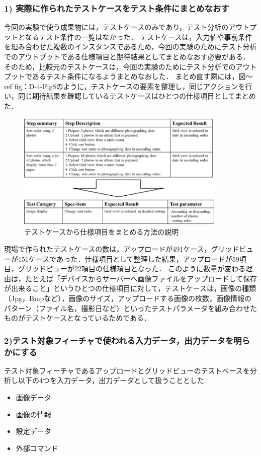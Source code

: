\subsubsection{1) 実際に作られたテストケースをテスト条件にまとめなおす}

今回の実験で使う成果物には，テストケースのみであり，テスト分析のアウトプットとなるテスト条件の一覧はなかった．
テストケースは，入力値や事前条件を組み合わせた複数のインスタンスであるため，今回の実験のためにテスト分析でのアウトプットである仕様項目と期待結果としてまとめなおす必要がある．
そのため，比較元のテストケースは，今回の実験のためにテスト分析でのアウトプットであるテスト条件になるようまとめなおした．
まとめ直す際には，図〜ref {fig：D-4-Fig8}のように，テストケースの要素を整理し，同じアクションを行い，同じ期待結果を確認しているテストケースはひとつの仕様項目としてまとめた．
\begin{figure}[htbp]
\begin{center}
\includegraphics[width=10cm]{./image/D-4-Fig8.png}
\caption{テストケースから仕様項目をまとめる方法の説明}
\label{fig:D-4-Fig8}
\end{center}
\end{figure}

現場で作られたテストケースの数は，アップロードが491ケース，グリッドビューが151ケースであった．仕様項目として整理した結果，アップロードが59項目，グリッドビューが22項目の仕様項目となった．
このように数量が変わる理由は，たとえば「デバイスからサーバーへ画像ファイルをアップロードして保存が出来ること」というひとつの仕様項目に対して，テストケースは，画像の種類（Jpg，Bmpなど），画像のサイズ，アップロードする画像の枚数，画像情報のパターン（ファイル名，撮影日など）といったテストパラメータを組み合わせたものがテストケースとなっているためである．

\subsubsection{2)テスト対象フィーチャで使われる入力データ，出力データを明らかにする}
テスト対象フィーチャであるアップロードとグリッドビューのテストベースを分析し以下の4つを入力データ，出力データとして扱うこととした.
\begin{itemize}
 \item 画像データ
 \item 画像の情報
 \item 設定データ
　\item 外部コマンド
\end{itemize}

